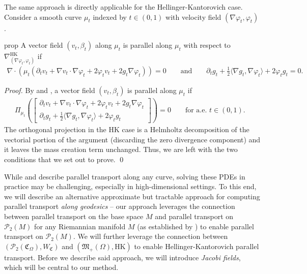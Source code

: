 \documentclass[11pt]{article}
\newcommand{\man}{M}
\begin{document}
The same approach is directly applicable for the Hellinger-Kantorovich case. Consider a smooth curve $\mu_t$ indexed by $t \in (0,1)$ with velocity field $(\nabla\varphi_t, \varphi_t)$. 

\begin{restatable}{prop}{} \label{HK parallel transport pde}
    A vector field $(v_t, \beta_t)$ along $\mu_t$ is parallel along $\mu_t$ with respect to $\nabla_{(\nabla\varphi_t, \varphi_t)}^{\text{HK}}$ if
    \begin{align*}
        \nabla \cdot (\mu_t (\partial_tv_t + \nabla v_t \cdot \nabla \varphi_t + 2\varphi_t v_t + 2g_t \nabla\varphi_t)) = 0 
        \qquad \text{and} \qquad 
        \partial_tg_t + \frac{1}{2}\langle\nabla g_t, \nabla\varphi_t\rangle + 2\varphi_t g_t = 0.
    \end{align*}
\end{restatable}
\noindent \textit{Proof.} By  and , a vector field $(v_t, \beta_t)$ is parallel along $\mu_t$ if
\begin{align}
    \Pi_{\mu_t}\left(\begin{bmatrix}
        \partial_tv_t + \nabla v_t\cdot \nabla\varphi_t + 2\varphi_tv_t +  2g_t\nabla\varphi_t \\
        \partial_tg_t + \frac{1}{2}\langle\nabla g_t, \nabla\varphi_t\rangle + 2\varphi_t g_t
    \end{bmatrix}\right) = 0 \qquad \text{for a.e. $t \in (0,1).$ }
\end{align}
The orthogonal projection in the HK case is a Helmholtz decomposition of the vectorial portion of the argument (discarding the zero divergence component) and it leaves the mass creation term unchanged. Thus, we are left with the two conditions that we set out to prove. \qed{}

While  and  describe parallel transport along any curve, solving these PDEs in practice may be challenging, especially in high-dimensional settings. To this end, we will describe an alternative approximate but tractable approach for computing parallel transport \textit{along geodesics} -- our approach leverages the connection between parallel transport on the base space $\man$ and parallel transport on $\mathcal{P}_{2}(\man)$ for any Riemannian manifold $\man$ (as established by \citet{gigli2012second}) to enable parallel transport on $\mathcal{P}_2(\man)$. We will further leverage the connection between $(\mathcal{P}_2(\mathfrak{C}_\Omega), W_\mathfrak{C})$ and $(\mathfrak{M}_+(\Omega), \text{HK})$ to enable Hellinger-Kantorovich parallel transport. Before we describe said approach, we will introduce \textit{Jacobi fields}, which will be central to our method.
\end{document}
